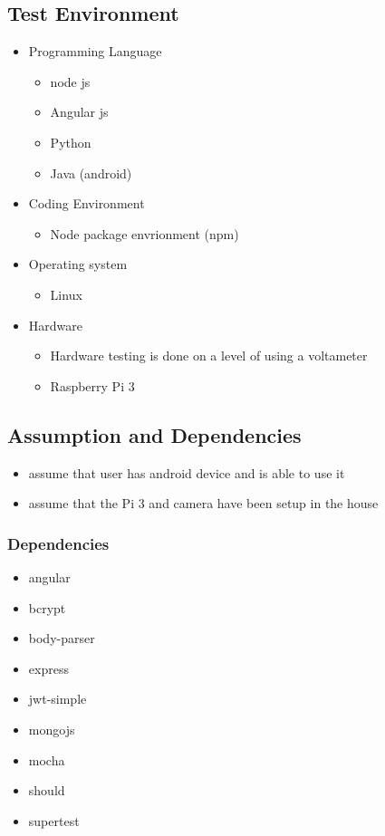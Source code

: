 \documentclass[a4paper,12pt]{article}
\begin{document}
		\subsection{Test Environment}
			\begin{itemize}
				\item Programming Language
					\begin{itemize}
						\item node js
						\item Angular js
						\item Python
						\item Java (android)
					\end{itemize}
			
			\item Coding Environment
				\begin{itemize}
					\item Node package envrionment (npm)
				\end{itemize}
		
			\item Operating system
				\begin{itemize}
					\item Linux
				\end{itemize}
		
			\item Hardware
				\begin{itemize}
					\item Hardware testing is done on a level of using a voltameter
					\item Raspberry Pi 3
				\end{itemize}
		\end{itemize}
	
	\subsection{Assumption and Dependencies}
		\begin{itemize}
			\item assume that user has android device and is able to use it
			\item assume that the Pi 3 and camera have been setup in the house
		\end{itemize}
		
		\subsubsection{Dependencies}
			\begin{itemize}
					\item angular
					\item bcrypt
					\item body-parser
					\item express
					\item jwt-simple
					\item mongojs
					\item mocha
					\item should
					\item supertest
			\end{itemize}
			
\end{document}
